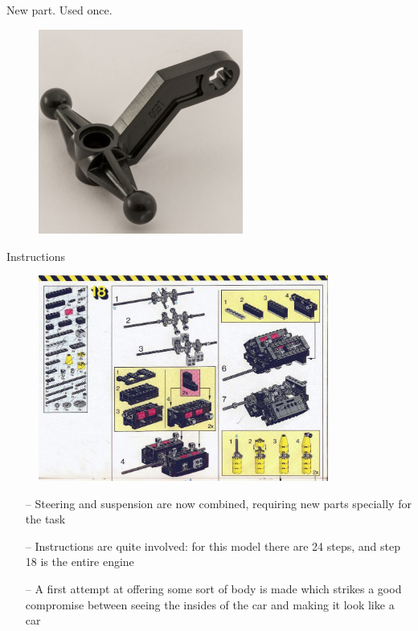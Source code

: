 \documentclass[xcolor=dvipsnames]{beamer}
\begin{document}
\begin{frame}[fragile]{New part. Used once.}
\begin{figure}[H]
 \centering
 \includegraphics[width=0.6\textwidth]{1988_8865_steering_arm.jpg}
\end{figure}
\end{frame}


\begin{frame}[fragile]{Instructions}
\begin{figure}[H]
 \centering
 \includegraphics[width=0.85\textwidth]{1988_8865_engine_instructions.jpg}
\end{figure}
\end{frame}

\begin{frame}[fragile]{}
\begin{itemize}
\item[--] Steering and suspension are now combined, requiring new parts specially for the task \vspace{3mm}
\item[--] Instructions are quite involved: for this model there are 24 steps, and step 18 is the entire engine \vspace{3mm}
\item[--] A first attempt at offering some sort of body is made which strikes a good compromise between seeing the insides of the car and making it look like a car \vspace{3mm}
\end{itemize}
\end{frame}
\end{document}
